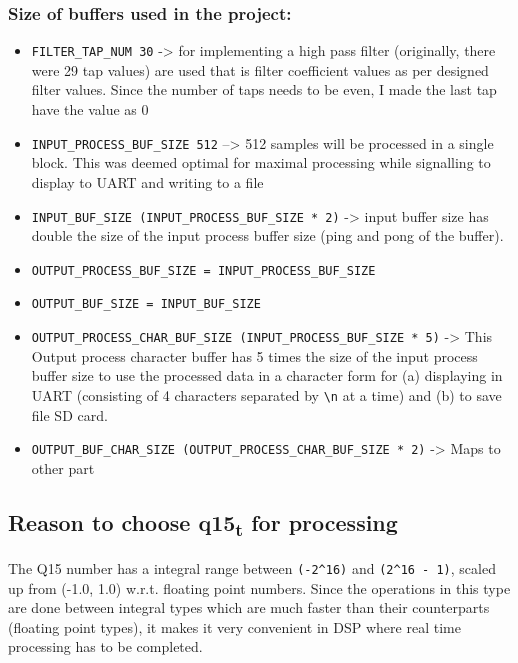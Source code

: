 \documentclass[11pt]{article}
\begin{document}
\subsubsection*{Size of buffers used in the project:}
\label{sec:orgd75a62c}
\begin{itemize}
\item \texttt{FILTER\_TAP\_NUM 30} -> for implementing a high pass filter (originally, there were 29 tap values) are used that is filter coefficient values as per designed filter values. Since the number of taps needs to be even, I made the last tap have the value as 0
\item \texttt{INPUT\_PROCESS\_BUF\_SIZE 512} –> 512 samples will be processed in a single block. This was deemed optimal for maximal processing while signalling to display to UART and writing to a file
\item \texttt{INPUT\_BUF\_SIZE (INPUT\_PROCESS\_BUF\_SIZE * 2)} -> input buffer size has double the size of the input process buffer size (ping and pong of the buffer).
\item \texttt{OUTPUT\_PROCESS\_BUF\_SIZE = INPUT\_PROCESS\_BUF\_SIZE}
\item \texttt{OUTPUT\_BUF\_SIZE = INPUT\_BUF\_SIZE}
\item \texttt{OUTPUT\_PROCESS\_CHAR\_BUF\_SIZE (INPUT\_PROCESS\_BUF\_SIZE * 5)} -> This Output process character buffer has 5 times the size of the input process buffer size to use the processed data in a character form for (a) displaying in UART (consisting of 4 characters separated by \texttt{\textbackslash{}n} at a time) and (b) to save file SD card.
\item \texttt{OUTPUT\_BUF\_CHAR\_SIZE (OUTPUT\_PROCESS\_CHAR\_BUF\_SIZE * 2)} -> Maps to other part
\end{itemize}

\subsection{Reason to choose q15\textsubscript{t} for processing}
\label{sec:org4e4d7a8}

The Q15 number has a integral range between \texttt{(-2\textasciicircum{}16)} and \texttt{(2\textasciicircum{}16 - 1)}, scaled up from (-1.0, 1.0) w.r.t. floating point numbers. Since the operations in this type are done between integral types which are much faster than their counterparts (floating point types), it makes it very convenient in DSP where real time processing has to be completed.
\end{document}
